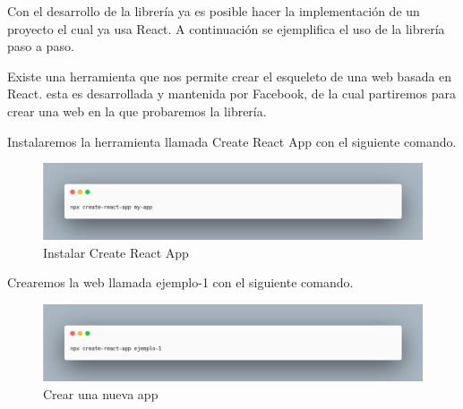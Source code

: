 Con el desarrollo de la librería ya es posible hacer la implementación de un proyecto el cual ya usa React.
A continuación se ejemplifica el uso de la librería paso a paso.

Existe una herramienta que nos permite crear el esqueleto de una web basada en React. \cite{CRA} esta es desarrollada y mantenida por Facebook, de la cual partiremos para crear una web en la que probaremos la librería.

Instalaremos la herramienta llamada Create React App con el siguiente comando.
\newline
\begin{figure}[H]
    \includegraphics[width=1\textwidth]{./Imagenes/9.1.png}
    \caption[Instalar Create React App]{Instalar Create React App}
    \end{figure}
\newline

Crearemos la web llamada ejemplo-1 con el siguiente comando.
\newline
\begin{figure}[H]
    \includegraphics[width=1\textwidth]{./Imagenes/9.2.png}
    \caption[Crear una nueva app]{Crear una nueva app}
    \end{figure}
\newline

